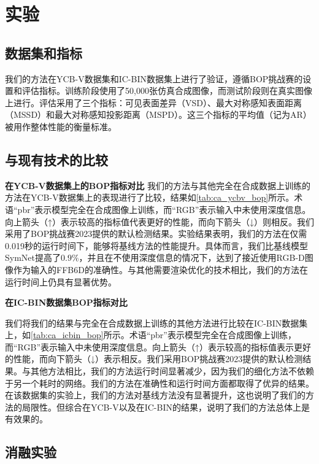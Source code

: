 \section{实验}

\subsection{数据集和指标}
我们的方法在YCB-V数据集\cite{xiang2018posecnn}和IC-BIN数据集\cite{icbin}上进行了验证，遵循BOP挑战赛\cite{hodan2024bop}的设置和评估指标。训练阶段使用了50,000张仿真合成图像，而测试阶段则在真实图像上进行。评估采用了三个指标：可见表面差异（VSD）、最大对称感知表面距离（MSSD）和最大对称感知投影距离（MSPD）。这三个指标的平均值（记为AR）被用作整体性能的衡量标准。

\subsection{与现有技术的比较}

\textbf{在YCB-V数据集上的BOP指标对比 } 我们的方法与其他完全在合成数据上训练的方法在YCB-V数据集上的表现进行了比较，结果如\autoref{tab:ca_ycbv_bop}所示。术语“pbr”表示模型完全在合成图像上训练，而“RGB”表示输入中未使用深度信息。向上箭头（↑）表示较高的指标值代表更好的性能，而向下箭头（↓）则相反。我们采用了BOP挑战赛2023\cite{hodan2024bop}提供的默认检测结果。实验结果表明，我们的方法在仅需0.019秒的运行时间下，能够将基线方法的性能提升。具体而言，我们比基线模型SymNet\cite{symnet}提高了$0.9\%$，并且在不使用深度信息的情况下，达到了接近使用RGB-D图像作为输入的FFB6D\cite{he2021ffb6d}的准确性。与其他需要渲染优化的技术相比，我们的方法在运行时间上仍具有显著优势。



\textbf{在IC-BIN数据集BOP指标对比}

我们将我们的结果与完全在合成数据上训练的其他方法进行比较在IC-BIN数据集上，如\autoref{tab:ca_icbin_bop}所示。术语“pbr”表示模型完全在合成图像上训练，而“RGB”表示输入中未使用深度信息。向上箭头（↑）表示较高的指标值表示更好的性能，而向下箭头（↓）表示相反。我们采用BOP挑战赛2023\cite{hodan2024bop}提供的默认检测结果。与其他方法相比，我们的方法运行时间显著减少，因为我们的细化方法不依赖于另一个耗时的网络。我们的方法在准确性和运行时间方面都取得了优异的结果。在该数据集的实验上，我们的方法对基线方法没有显著提升，这也说明了我们的方法的局限性。但综合在YCB-V以及在IC-BIN的结果，说明了我们的方法总体上是有效果的。



\subsection{消融实验}

